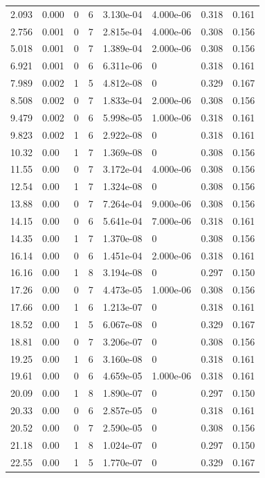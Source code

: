 \documentclass[preview]{standalone}
\begin{document}
{{\begin{tabular}{L{1.2cm}C{1.2cm} C{0.3cm}C{0.5cm} C{1.4cm}C{1.4cm} C{1.4cm}C{1.4cm}}
  2.093  &  0.000  & 0     &  6 &  3.130e-04  & 4.000e-06  & 0.318 &  0.161   \\ 
  2.756  &  0.001  & 0     &  7 &  2.815e-04  & 4.000e-06  & 0.308 &  0.156   \\ 
  5.018  &  0.001  & 0     &  7 &  1.389e-04  & 2.000e-06  & 0.308 &  0.156   \\ 
  6.921  &  0.001  & 0     &  6 &  6.311e-06  & 0  & 0.318 &  0.161   \\ 
  7.989  &  0.002  & 1     &  5 &  4.812e-08  & 0  & 0.329 &  0.167   \\ 
  8.508  &  0.002  & 0     &  7 &  1.833e-04  & 2.000e-06  & 0.308 &  0.156   \\ 
  9.479  &  0.002  & 0     &  6 &  5.998e-05  & 1.000e-06  & 0.318 &  0.161   \\ 
  9.823  &  0.002  & 1     &  6 &  2.922e-08  & 0  & 0.318 &  0.161   \\ 
  10.32  &  0.00  & 1     &  7 &  1.369e-08  & 0  & 0.308 &  0.156   \\ 
  11.55  &  0.00  & 0     &  7 &  3.172e-04  & 4.000e-06  & 0.308 &  0.156   \\ 
  12.54  &  0.00  & 1     &  7 &  1.324e-08  & 0  & 0.308 &  0.156   \\ 
  13.88  &  0.00  & 0     &  7 &  7.264e-04  & 9.000e-06  & 0.308 &  0.156   \\ 
  14.15  &  0.00  & 0     &  6 &  5.641e-04  & 7.000e-06  & 0.318 &  0.161   \\ 
  14.35  &  0.00  & 1     &  7 &  1.370e-08  & 0  & 0.308 &  0.156   \\ 
  16.14  &  0.00  & 0     &  6 &  1.451e-04  & 2.000e-06  & 0.318 &  0.161   \\ 
  16.16  &  0.00  & 1     &  8 &  3.194e-08  & 0  & 0.297 &  0.150   \\ 
  17.26  &  0.00  & 0     &  7 &  4.473e-05  & 1.000e-06  & 0.308 &  0.156   \\ 
  17.66  &  0.00  & 1     &  6 &  1.213e-07  & 0  & 0.318 &  0.161   \\ 
  18.52  &  0.00  & 1     &  5 &  6.067e-08  & 0  & 0.329 &  0.167   \\ 
  18.81  &  0.00  & 0     &  7 &  3.206e-07  & 0  & 0.308 &  0.156   \\ 
  19.25  &  0.00  & 1     &  6 &  3.160e-08  & 0  & 0.318 &  0.161   \\ 
  19.61  &  0.00  & 0     &  6 &  4.659e-05  & 1.000e-06  & 0.318 &  0.161   \\ 
  20.09  &  0.00  & 1     &  8 &  1.890e-07  & 0  & 0.297 &  0.150   \\ 
  20.33  &  0.00  & 0     &  6 &  2.857e-05  & 0  & 0.318 &  0.161   \\ 
  20.52  &  0.00  & 0     &  7 &  2.590e-05  & 0  & 0.308 &  0.156   \\ 
  21.18  &  0.00  & 1     &  8 &  1.024e-07  & 0  & 0.297 &  0.150   \\ 
  22.55  &  0.00  & 1     &  5 &  1.770e-07  & 0  & 0.329 &  0.167   \\ 
\hline 
\end{tabular} 

}}
\end{document}

